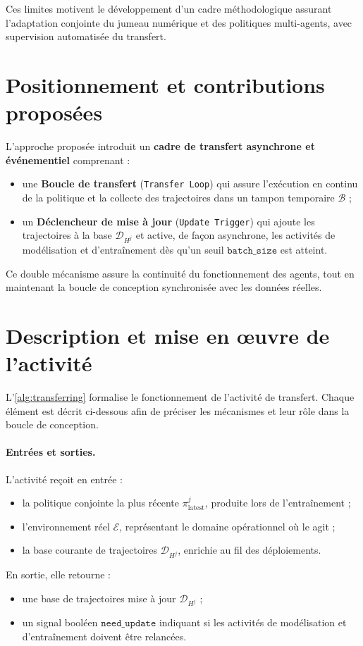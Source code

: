 Ces limites motivent le développement d'un cadre méthodologique assurant l'adaptation conjointe du jumeau numérique et des politiques multi-agents, avec supervision automatisée du transfert.

\section{Positionnement et contributions proposées}

L'approche proposée introduit un \textbf{cadre de transfert asynchrone et événementiel} comprenant :
\begin{itemize}
  \item une \textbf{Boucle de transfert} (\texttt{Transfer Loop}) qui assure l'exécution en continu de la politique et la collecte des trajectoires dans un tampon temporaire $\mathcal{B}$ ;
  \item un \textbf{Déclencheur de mise à jour} (\texttt{Update Trigger}) qui ajoute les trajectoires à la base $\mathcal{D}_{H^j}$ et active, de façon asynchrone, les activités de modélisation et d'entraînement dès qu'un seuil $\texttt{batch\_size}$ est atteint.
\end{itemize}

Ce double mécanisme assure la continuité du fonctionnement des agents, tout en maintenant la boucle de conception synchronisée avec les données réelles.

\section{Description et mise en œuvre de l'activité}

L'\autoref{alg:transferring} formalise le fonctionnement de l'activité de transfert.
Chaque élément est décrit ci-dessous afin de préciser les mécanismes et leur rôle dans la boucle de conception.

\paragraph{Entrées et sorties.}
L'activité reçoit en entrée :
\begin{itemize}
  \item la politique conjointe la plus récente $\pi^j_{\text{latest}}$, produite lors de l'entraînement ;
  \item l'environnement réel $\mathcal{E}$, représentant le domaine opérationnel où le  agit ;
  \item la base courante de trajectoires $\mathcal{D}_{H^j}$, enrichie au fil des déploiements.
\end{itemize}
En sortie, elle retourne :
\begin{itemize}
  \item une base de trajectoires mise à jour $\mathcal{D}_{H^j}$ ;
  \item un signal booléen $\texttt{need\_update}$ indiquant si les activités de modélisation et d'entraînement doivent être relancées.
\end{itemize}

